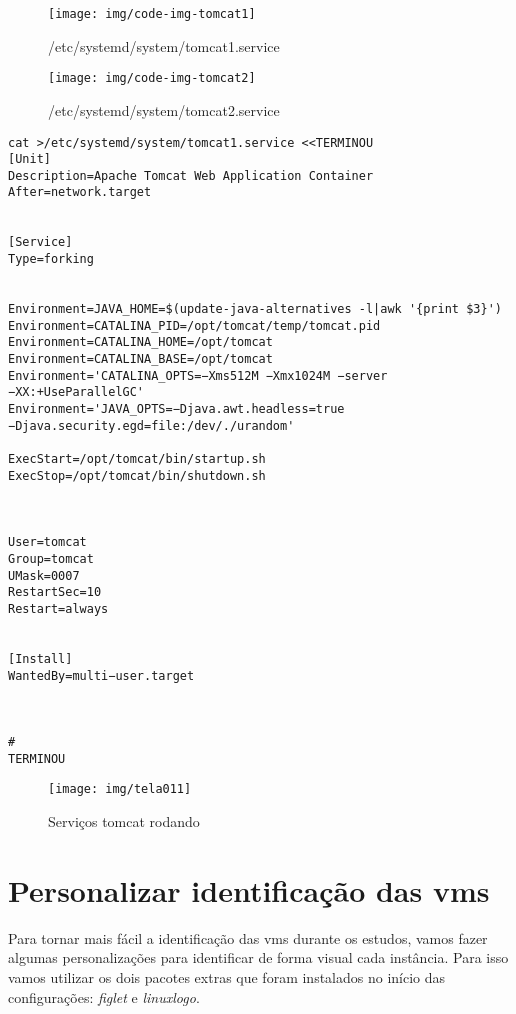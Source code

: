\begin{figure}[H]
	\centering
	\caption[tomcat1.service]{/etc/systemd/system/tomcat1.service}
	\texttt{[image: img/code-img-tomcat1]}
	\label{fig:tomcat1.service}
\end{figure}

\begin{figure}[H]
	\centering
	\caption[tomcat2.service]{/etc/systemd/system/tomcat2.service}
	\texttt{[image: img/code-img-tomcat2]}
	\label{fig:tomcat2.service}
\end{figure}
	
\begin{lstlisting}[breaklines=true,basicstyle=\scriptsize,	breaklines=true, label=servico01,showspaces=false,showstringspaces=false,caption={Script exemplo para gerar arquivo de serviço}]
cat >/etc/systemd/system/tomcat1.service <<TERMINOU
[Unit]
Description=Apache Tomcat Web Application Container
After=network.target


[Service]
Type=forking


Environment=JAVA_HOME=$(update-java-alternatives -l|awk '{print $3}')
Environment=CATALINA_PID=/opt/tomcat/temp/tomcat.pid
Environment=CATALINA_HOME=/opt/tomcat
Environment=CATALINA_BASE=/opt/tomcat
Environment='CATALINA_OPTS=−Xms512M −Xmx1024M −server −XX:+UseParallelGC'
Environment='JAVA_OPTS=−Djava.awt.headless=true −Djava.security.egd=file:/dev/./urandom'

ExecStart=/opt/tomcat/bin/startup.sh
ExecStop=/opt/tomcat/bin/shutdown.sh



User=tomcat
Group=tomcat
UMask=0007
RestartSec=10
Restart=always


[Install]
WantedBy=multi−user.target



#
TERMINOU
\end{lstlisting}

\begin{figure}[H]
	\centering
	\caption[tomcat1 e tomcat2]{Serviços tomcat rodando}
	\texttt{[image: img/tela011]}
	\label{fig:tomcat1e2.service}
\end{figure}

\newpage
\section{Personalizar identificação das vms}

Para tornar mais fácil a identificação das vms durante os estudos, vamos fazer algumas personalizações para identificar de forma visual cada instância. Para isso vamos utilizar os dois pacotes extras que foram instalados no início das configurações: \emph{figlet} e \emph{linuxlogo}.


